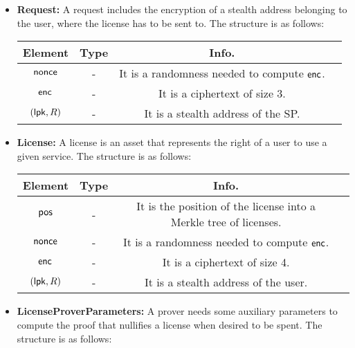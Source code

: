 \begin{itemize}
    \item \textbf{Request:} A request includes the encryption of a stealth address belonging to the user, where the license has to be sent to. The structure is as follows:

    \begin{center}
        \begin{tabular}{ |c|c|c|c| } 
        \hline
        \textbf{Element} & \textbf{Type} & \textbf{Info.} \\
        \hline
        $\mathsf{nonce}$ & - & It is a randomness needed to compute $\mathsf{enc}$. \\ 
        $\mathsf{enc}$ & - & It is a ciphertext of size 3. \\
        $(\mathsf{lpk}, R)$ & - & It is a stealth address of the SP. \\
        \hline
        \end{tabular}
    \end{center}


    \item \textbf{License:} A license is an asset that represents the right of a user to use a given service. The structure is as follows:

    \begin{center}
        \begin{tabular}{ |c|c|c|c| } 
        \hline
        \textbf{Element} & \textbf{Type} & \textbf{Info.} \\
        \hline
        $\mathsf{pos}$ & - & It is the position of the license into a Merkle tree of licenses. \\ 
        $\mathsf{nonce}$ & - & It is a randomness needed to compute $\mathsf{enc}$. \\ 
        $\mathsf{enc}$ & - & It is a ciphertext of size 4. \\
        $(\mathsf{lpk}, R)$ & - & It is a stealth address of the user. \\
        \hline
        \end{tabular}
    \end{center}

    \item \textbf{LicenseProverParameters:} A prover needs some auxiliary parameters to compute the proof that nullifies a license when desired to be spent. The structure is as follows:


\end{itemize}
